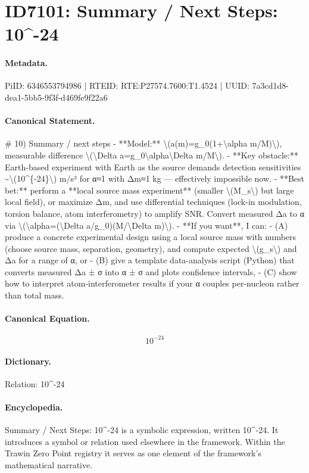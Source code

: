 \section*{ID7101: Summary / Next Steps: 10\textasciicircum{}-24}
\paragraph{Metadata.}
PiID: 6346553794986 | RTEID: RTE:P27574.7600:T1.4524 | UUID: 7a3cd1d8-dea1-5bb5-9f3f-d469fe9f22a6

\paragraph{Canonical Statement.}
\# 10) Summary / next steps - **Model:** \textbackslash{}(a(m)=g\_0(1+\textbackslash{}alpha m/M)\textbackslash{}), measurable difference \textbackslash{}(\textbackslash{}Delta a=g\_0\textbackslash{}alpha\textbackslash{}Delta m/M\textbackslash{}). - **Key obstacle:** Earth-based experiment with Earth as the source demands detection sensitivities \textasciitilde{}\textbackslash{}(10\textasciicircum{}\{-24\}\textbackslash{}) m/s² for α≈1 with Δm≈1 kg — effectively impossible now. - **Best bet:** perform a **local source mass experiment** (smaller \textbackslash{}(M\_s\textbackslash{}) but large local field), or maximize Δm, and use differential techniques (lock-in modulation, torsion balance, atom interferometry) to amplify SNR. Convert measured Δa to α via \textbackslash{}(\textbackslash{}alpha=(\textbackslash{}Delta a/g\_0)(M/\textbackslash{}Delta m)\textbackslash{}). - **If you want**, I can: - (A) produce a concrete experimental design using a local source mass with numbers (choose source mass, separation, geometry), and compute expected \textbackslash{}(g\_s\textbackslash{}) and Δa for a range of α, or - (B) give a template data-analysis script (Python) that converts measured Δa ± σ into α ± σ and plots confidence intervals, - (C) show how to interpret atom-interferometer results if your α couples per-nucleon rather than total mass.

\paragraph{Canonical Equation.}
\[
10^{-24}
\]

\paragraph{Dictionary.}
Relation: 10\textasciicircum{}-24

\paragraph{Encyclopedia.}
Summary / Next Steps: 10\textasciicircum{}-24 is a symbolic expression, written 10\textasciicircum{}-24. It introduces a symbol or relation used elsewhere in the framework. Within the Trawin Zero Point registry it serves as one element of the framework's mathematical narrative.
